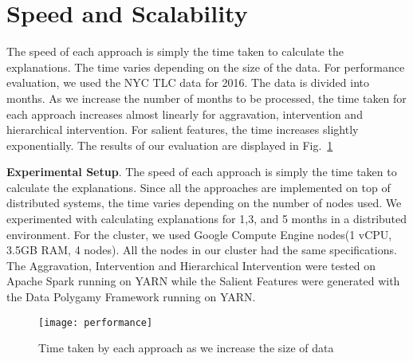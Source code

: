 


\section{Speed and Scalability}
\label{sec:speed}
The speed of each approach is simply the time taken to calculate the explanations. The time varies depending on the size of the data. For performance evaluation, we used the NYC TLC data for 2016. The data is divided into months. As we increase the number of months to be processed, the time taken for each approach increases almost linearly for aggravation, intervention and hierarchical intervention. For salient features, the time increases slightly exponentially. The results of our evaluation are displayed in Fig.~\ref{fig:performance}

\textbf{Experimental Setup}. The speed of each approach is simply the time taken to calculate the explanations. Since all the approaches are implemented on top of distributed systems, the time varies depending on the number of nodes used. We experimented with calculating explanations for 1,3, and 5 months in a distributed environment. For the cluster, we used Google Compute Engine nodes(1 vCPU, 3.5GB RAM, 4 nodes). All the nodes in our cluster had the same specifications. The Aggravation, Intervention and Hierarchical Intervention were tested on Apache Spark running on YARN while the Salient Features were generated with the Data Polygamy Framework running on YARN.
\begin{figure}[h]
\texttt{[image: performance]}
\caption{Time taken by each approach as we increase the size of data}
\label{fig:performance}
\end{figure}

